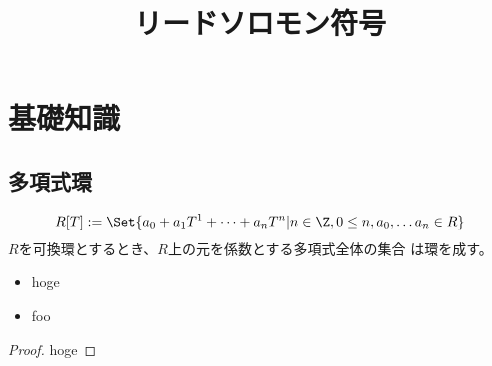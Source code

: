\documentclass[uplatex, 11pt, a4j, dvipdfmx]{jsarticle}
\title{リードソロモン符号}
\author{}
\date{}
\begin{document}
\maketitle

\section{基礎知識}
  \subsection{多項式環}
    \begin{equation}
      R[T] := \Set{ a_0 + a_1 T^1 + \cdots + a_n T^n | n \in \Z, 0 \le n, a_0, \ldots a_n \in R }
    \end{equation}
    $R$を可換環とするとき、$R$上の元を係数とする多項式全体の集合
    は環を成す。
    \begin{itemize}
      \item hoge
      \item foo
    \end{itemize}

    \begin{screen}
      \begin{proof}
        hoge
      \end{proof}
    \end{screen}
\end{document}
